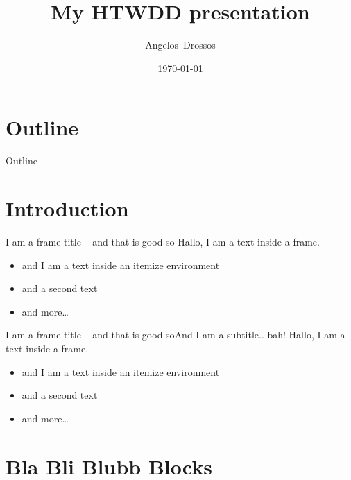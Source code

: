\documentclass[]{beamer}
\title[My Presentation]{My HTWDD presentation}
\author[A.~Drossos]{Angelos~Drossos}
\institute[HTWDD]{University of Applied Sciences Dresden}
\date{\today} %
\begin{document}
%
%

\frame[plain]{\titlepage}

%
%
\section*{Outline}

\begin{frame}{Outline}
	\tableofcontents[hideallsubsections]
\end{frame}

%
%
\section{Introduction}

\begin{frame}{\secname{}}
\end{frame}

\begin{frame}{I am a frame title -- and that is good so}
Hallo, I am a text inside a frame.

\vfill

\begin{itemize}
\item and I am a text inside an itemize environment
\item and a second text
\item and more\ldots
\end{itemize}
\end{frame}


\begin{frame}{I am a frame title -- and that is good so}{And I am a subtitle.. bah!}
Hallo, I am a text inside a frame.

\vfill

\begin{itemize}
\item and I am a text inside an itemize environment
\item and a second text
\item and more\ldots
\end{itemize}
\end{frame}


%
%
\section{Bla Bli Blubb Blocks}
\end{document}
